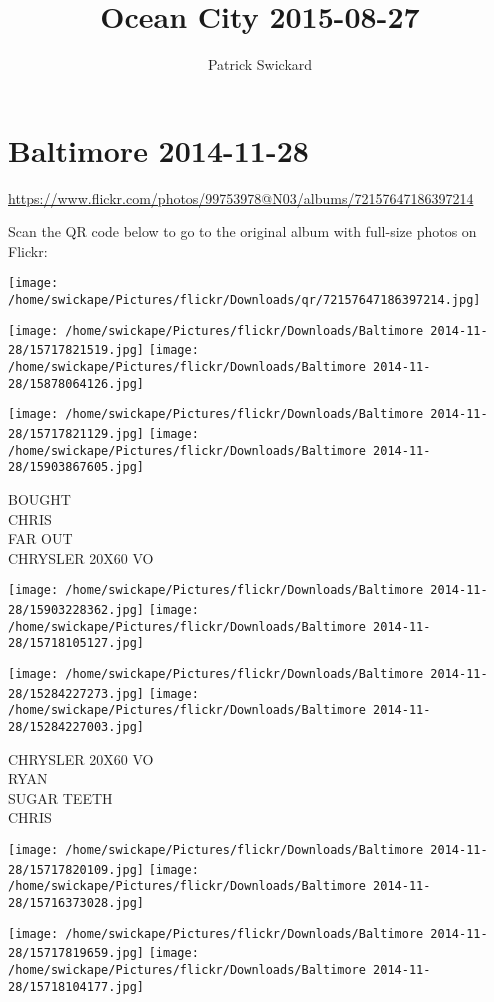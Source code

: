 \documentclass[10pt,letterpaper]{article}
\title{Ocean City 2015-08-27}
\author{Patrick Swickard}
\date{}
\begin{document}
\section*{Baltimore 2014-11-28}

\url{https://www.flickr.com/photos/99753978@N03/albums/72157647186397214}

Scan the QR code below to go to the original album with full-size photos on Flickr:

\texttt{[image: /home/swickape/Pictures/flickr/Downloads/qr/72157647186397214.jpg]}
\pagebreak

\texttt{[image: /home/swickape/Pictures/flickr/Downloads/Baltimore 2014-11-28/15717821519.jpg]}
\texttt{[image: /home/swickape/Pictures/flickr/Downloads/Baltimore 2014-11-28/15878064126.jpg]}

\texttt{[image: /home/swickape/Pictures/flickr/Downloads/Baltimore 2014-11-28/15717821129.jpg]}
\texttt{[image: /home/swickape/Pictures/flickr/Downloads/Baltimore 2014-11-28/15903867605.jpg]}

BOUGHT\\
CHRIS\\
FAR OUT\\
CHRYSLER 20X60 VO
\pagebreak

\texttt{[image: /home/swickape/Pictures/flickr/Downloads/Baltimore 2014-11-28/15903228362.jpg]}
\texttt{[image: /home/swickape/Pictures/flickr/Downloads/Baltimore 2014-11-28/15718105127.jpg]}

\texttt{[image: /home/swickape/Pictures/flickr/Downloads/Baltimore 2014-11-28/15284227273.jpg]}
\texttt{[image: /home/swickape/Pictures/flickr/Downloads/Baltimore 2014-11-28/15284227003.jpg]}

CHRYSLER 20X60 VO\\
RYAN\\
SUGAR TEETH\\
CHRIS
\pagebreak

\texttt{[image: /home/swickape/Pictures/flickr/Downloads/Baltimore 2014-11-28/15717820109.jpg]}
\texttt{[image: /home/swickape/Pictures/flickr/Downloads/Baltimore 2014-11-28/15716373028.jpg]}

\texttt{[image: /home/swickape/Pictures/flickr/Downloads/Baltimore 2014-11-28/15717819659.jpg]}
\texttt{[image: /home/swickape/Pictures/flickr/Downloads/Baltimore 2014-11-28/15718104177.jpg]}
\end{document}
